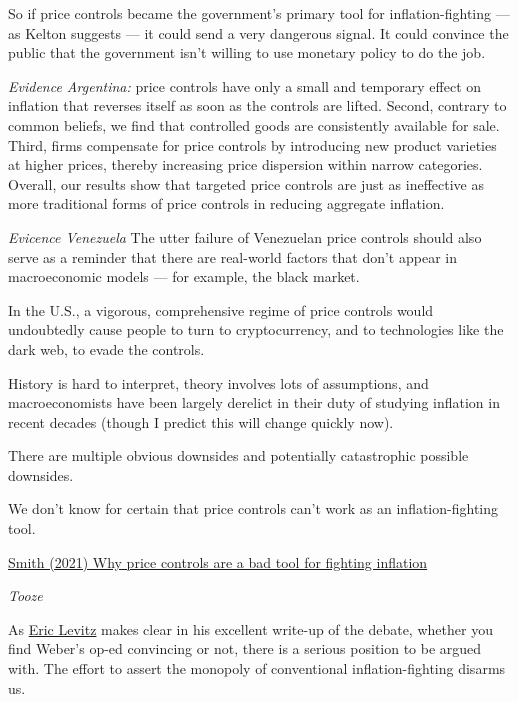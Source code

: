 \documentclass[
]{book}
\begin{document}
So if price controls became the government's primary tool for inflation-fighting --- as Kelton suggests --- it could send a very dangerous signal.
It could convince the public that the government isn't willing to use monetary policy to do the job.

\emph{Evidence Argentina:}
price controls have only a small and temporary effect on inflation that reverses itself as soon as the controls are lifted. Second, contrary to common beliefs, we find that controlled goods are consistently available for sale. Third, firms compensate for price controls by introducing new product varieties at higher prices, thereby increasing price dispersion within narrow categories. Overall, our results show that targeted price controls are just as ineffective as more traditional forms of price controls in reducing aggregate inflation.

\emph{Evicence Venezuela}
The utter failure of Venezuelan price controls should also serve as a reminder that there are real-world factors that don't appear in macroeconomic models --- for example, the black market.

In the U.S., a vigorous, comprehensive regime of price controls would undoubtedly cause people to turn to cryptocurrency, and to technologies like the dark web, to evade the controls.

History is hard to interpret, theory involves lots of assumptions, and macroeconomists have been largely derelict in their duty of studying inflation in recent decades (though I predict this will change quickly now).

There are multiple obvious downsides and potentially catastrophic possible downsides.

We don't know for certain that price controls can't work as an inflation-fighting tool.

\href{https://noahpinion.substack.com/p/why-price-controls-are-a-bad-tool}{Smith (2021) Why price controls are a bad tool for fighting inflation}

\emph{Tooze}

As \href{https://nymag.com/intelligencer/2022/01/to-combat-inflation-the-u-s-should-impose-price-controls.html}{Eric Levitz} makes clear in his excellent write-up of the debate, whether you find Weber's op-ed convincing or not, there is a serious position to be argued with. The effort to assert the monopoly of conventional inflation-fighting disarms us.
\end{document}
